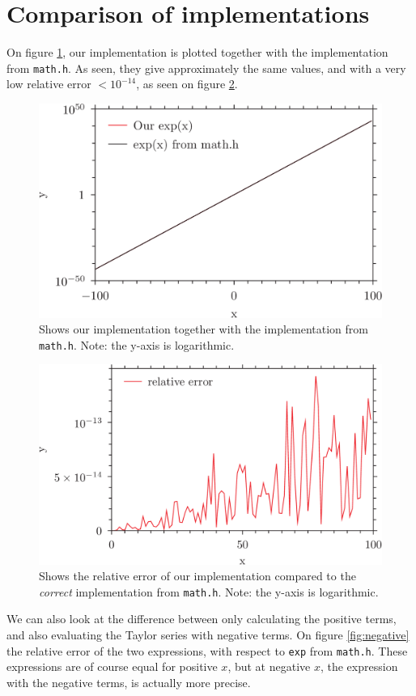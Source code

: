 \documentclass{article}
\begin{document}
\section{Comparison of implementations}
On figure \ref{fig:1}, our implementation is plotted together with the implementation from \texttt{math.h}. As seen, they give approximately the same values, and with a very low relative error $<10^{-14}$, as seen on figure \ref{fig:relative}.
\begin{figure}[h]
	\centering
	\includegraphics{plot1.png}
	\caption{Shows our implementation together with the implementation from \texttt{math.h}. Note: the y-axis is logarithmic.}
	\label{fig:1}
\end{figure}
\begin{figure}[h]
	\includegraphics{plot2.png}
	\caption{Shows the relative error of our implementation compared to the \textit{correct} implementation from \texttt{math.h}. Note: the y-axis is logarithmic.}
	\label{fig:relative}
\end{figure}
We can also look at the difference between only calculating the positive terms, and also evaluating the Taylor series with negative terms. On figure \ref{fig:negative} the relative error of the two expressions, with respect to \texttt{exp} from \texttt{math.h}. These expressions are of course equal for positive $ x $, but at negative $ x $, the expression with the negative terms, is actually more precise.
\end{document}
